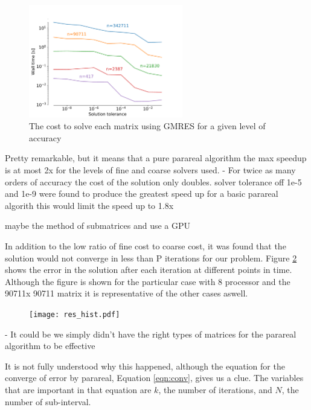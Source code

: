 \documentclass[conf]{new-aiaa}
\begin{document}
\begin{figure}[H]
	\centering
	\includegraphics[width=0.60\textwidth,keepaspectratio]{acc_timing.pdf}
	\caption{The cost to solve each matrix using GMRES for a given level of accuracy}
	\label{fig:acc_timing}
\end{figure}

Pretty remarkable, but it means that a pure parareal algorithm the max speedup is at most 2x for the levels of fine and coarse solvers used.
- For twice as many orders of accuracy the cost of the solution only doubles.
solver tolerance off 1e-5 and 1e-9 were found to produce the greatest speed up
for a basic parareal algorith this would limit the speed up to 1.8x




maybe the method of submatrices and use a GPU




In addition to the low ratio of fine cost to coarse cost, it was found that the solution would not converge in less than P iterations for our problem.
Figure \ref{fig:res_hist} shows the error in the solution after each iteration at different points in time.
Although the figure is shown for the particular case with 8 processor and the 90711x 90711 matrix it is representative of the other cases aswell.

\begin{figure}[H]
    \centering
    \texttt{[image: res\_hist.pdf]}
    \caption{}
    \label{fig:res_hist}
\end{figure}


- It could be we simply didn't have the right types of matrices for the parareal algorithm to be effective


It is not fully understood why this happened, although the equation for the converge of error by parareal, Equation \ref{eqn:conv}, gives us a clue. The variables that are important in that equation are $k$, the number of iterations, and $N$, the number of sub-interval.
\end{document}
